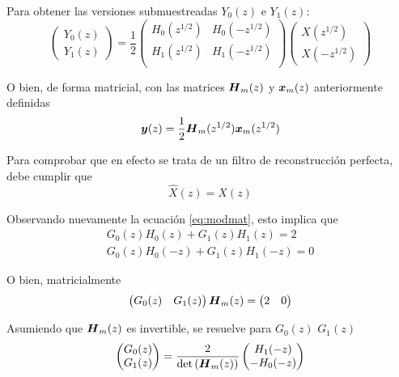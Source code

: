 
	Para obtener las versiones submuestreadas $Y_0(z)$ e $Y_1(z)$:
		\begin{equation}
			\begin{pmatrix}
				Y_0(z) \\
				Y_1(z)
			\end{pmatrix}
			=
			\frac{1}{2}
			\begin{pmatrix}
				H_0(z^{1/2}) & H_0(-z^{1/2}) \\
				H_1(z^{1/2}) & H_1(-z^{1/2}) \\
			\end{pmatrix}
			\begin{pmatrix}
				X(z^{1/2}) \\
				X(-z^{1/2})
			\end{pmatrix}
		\end{equation}
	
	O bien, de forma matricial, con las matrices $\boldsymbol{H}_m(z)$ y $\boldsymbol{x}_m(z)$ anteriormente definidas
		\begin{equation}
			\boldsymbol{y}(z)=\frac{1}{2}\boldsymbol{H}_m(z^{1/2})\boldsymbol{x}_m(z^{1/2})
		\end{equation}

	Para comprobar que en efecto se trata de un filtro de reconstrucción perfecta, debe cumplir que
		\begin{equation}
			\hat{X}(z)=X(z)
		\end{equation}

	Observando nuevamente la ecuación \eqref{eq:modmat}, esto implica que
		\begin{align}
			G_0(z)H_0(z)+G_1(z)H_1(z)=2		\label{eq:modcond}\\
			G_0(z)H_0(-z)+G_1(z)H_1(-z)=0		\label{eq:modcond2}
		\end{align}

	O bien, matricialmente
		\begin{equation}
			\begin{pmatrix}
				G_0(z) & G_1(z)
			\end{pmatrix}
			\boldsymbol{H}_m(z)
			=
			\begin{pmatrix}
				2 & 0
			\end{pmatrix}
		\end{equation}

	Asumiendo que $\boldsymbol{H}_m(z)$ es invertible, se resuelve para $G_0(z)$ $G_1(z)$
		\begin{equation}
			\begin{pmatrix}
				G_0(z) \\
				G_1(z)
			\end{pmatrix}
			=
			\frac{2}{\det{(\boldsymbol{H}_m(z))}}
			\begin{pmatrix}
				H_1(-z) \\
				-H_0(-z)
			\end{pmatrix}
		\end{equation}
		
